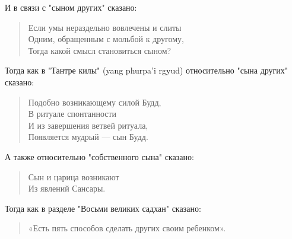 \begin{siderules}
И в связи с "сыном других" сказано:

\begin{verse}
Если умы нераздельно вовлечены и слиты\\
Одним, обращенным с мольбой к другому,\\
Тогда какой смысл становиться сыном?
\end{verse}

Тогда как в "Тантре килы" (yang phurpa'i rgyud) относительно "сына других" сказано:

\begin{verse}
Подобно возникающему силой Будд,\\
В ритуале спонтанности\\
И из завершения ветвей ритуала,\\
Появляется мудрый — сын Будд.
\end{verse}

А также относительно "собственного сына" сказано:

\begin{verse}
Сын и царица возникают\\
Из явлений Сансары.\\
\end{verse}

Тогда как в разделе "Восьми великих садхан" сказано:

\begin{verse}
«Есть пять способов сделать других своим ребенком».
\end{verse}


\end{siderules}
